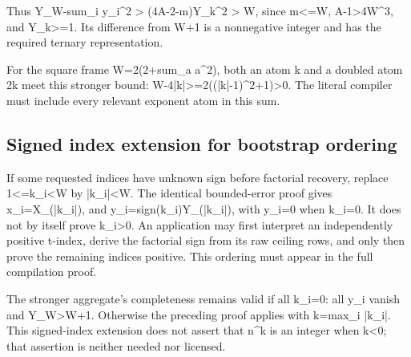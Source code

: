 Thus Y\_\allowbreak{}W-sum\_\allowbreak{}i y\_\allowbreak{}i\textasciicircum{}\allowbreak{}2 \textgreater{}\allowbreak{} (4A-2-m)Y\_\allowbreak{}k\textasciicircum{}\allowbreak{}2 \textgreater{}\allowbreak{} W, since m\textless{}\allowbreak{}=\allowbreak{}W, A-1\textgreater{}\allowbreak{}4W\textasciicircum{}\allowbreak{}3, and Y\_\allowbreak{}k\textgreater{}\allowbreak{}=\allowbreak{}1. Its difference from W+\allowbreak{}1 is a nonnegative integer and has the required ternary representation.



For the square frame W=\allowbreak{}2(2+\allowbreak{}sum\_\allowbreak{}a a\textasciicircum{}\allowbreak{}2), both an atom k and a doubled atom 2k meet this stronger bound: W-4|k|\textgreater{}\allowbreak{}=\allowbreak{}2((|k|-1)\textasciicircum{}\allowbreak{}2+\allowbreak{}1)\textgreater{}\allowbreak{}0. The literal compiler must include every relevant exponent atom in this sum.



\subsection{Signed index extension for bootstrap ordering}



If some requested indices have unknown sign before factorial recovery, replace 1\textless{}\allowbreak{}=\allowbreak{}k\_\allowbreak{}i\textless{}\allowbreak{}W by |k\_\allowbreak{}i|\textless{}\allowbreak{}W. The identical bounded-error proof gives x\_\allowbreak{}i=\allowbreak{}X\_\allowbreak{}(|k\_\allowbreak{}i|), and y\_\allowbreak{}i=\allowbreak{}sign(k\_\allowbreak{}i)Y\_\allowbreak{}(|k\_\allowbreak{}i|), with y\_\allowbreak{}i=\allowbreak{}0 when k\_\allowbreak{}i=\allowbreak{}0. It does not by itself prove k\_\allowbreak{}i\textgreater{}\allowbreak{}0. An application may first interpret an independently positive t-index, derive the factorial sign from its raw ceiling rows, and only then prove the remaining indices positive. This ordering must appear in the full compilation proof.



The stronger aggregate's completeness remains valid if all k\_\allowbreak{}i=\allowbreak{}0: all y\_\allowbreak{}i vanish and Y\_\allowbreak{}W\textgreater{}\allowbreak{}W+\allowbreak{}1. Otherwise the preceding proof applies with k=\allowbreak{}max\_\allowbreak{}i |k\_\allowbreak{}i|. This signed-index extension does not assert that n\textasciicircum{}\allowbreak{}k is an integer when k\textless{}\allowbreak{}0; that assertion is neither needed nor licensed.
